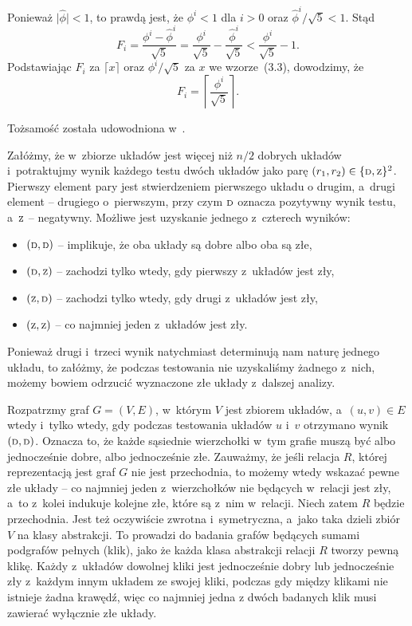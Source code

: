 \subproblem %
Ponieważ $\bigl|\widehat\phi\bigr|<1$, to prawdą jest, że $\phi^i<1$ dla $i>0$ oraz $\widehat\phi^i/\sqrt{5}<1$. Stąd
\[
	F_i = \frac{\phi^i-\widehat\phi^i}{\sqrt{5}} = \frac{\phi^i}{\sqrt{5}}-\frac{\widehat\phi^i}{\sqrt{5}} < \frac{\phi^i}{\sqrt{5}}-1.
\]
Podstawiając $F_i$ za $\lceil x\rceil$ oraz $\phi^i/\sqrt{5}$ za $x$ we wzorze~(3.3), dowodzimy, że
\[
	F_i = \left\lceil\frac{\phi^i}{\sqrt{5}}\right\rceil.
\]

\subproblem %
Tożsamość została udowodniona w~.


\subproblem %
Załóżmy, że w~zbiorze układów jest więcej niż $n/2$ dobrych układów i~potraktujmy wynik każdego testu dwóch układów jako parę $(r_1,r_2)\in\{{\scriptstyle\rm D},{\scriptstyle\rm Z}\}^2$. Pierwszy element pary jest stwierdzeniem pierwszego układu o drugim, a~drugi element -- drugiego o~pierwszym, przy czym ${\scriptstyle\rm D}$ oznacza pozytywny wynik testu, a~${\scriptstyle\rm Z}$ -- negatywny. Możliwe jest uzyskanie jednego z~czterech wyników:
\begin{itemize}
	\item $({\scriptstyle\rm D},{\scriptstyle\rm D})$ -- implikuje, że oba układy są dobre albo oba są złe,
	\item $({\scriptstyle\rm D},{\scriptstyle\rm Z})$ -- zachodzi tylko wtedy, gdy pierwszy z~układów jest zły,
	\item $({\scriptstyle\rm Z},{\scriptstyle\rm D})$ -- zachodzi tylko wtedy, gdy drugi z~układów jest zły,
	\item $({\scriptstyle\rm Z},{\scriptstyle\rm Z})$ -- co najmniej jeden z~układów jest zły.
\end{itemize}
Ponieważ drugi i~trzeci wynik natychmiast determinują nam naturę jednego układu, to załóżmy, że podczas testowania nie uzyskaliśmy żadnego z~nich, możemy bowiem odrzucić wyznaczone złe układy z~dalszej analizy.

Rozpatrzmy graf $G=(V,E)$, w~którym $V$ jest zbiorem układów, a~$(u,v)\in E$ wtedy i~tylko wtedy, gdy podczas testowania układów $u$ i~$v$ otrzymano wynik $({\scriptstyle\rm D},{\scriptstyle\rm D})$. Oznacza to, że każde sąsiednie wierzchołki w~tym grafie muszą być albo jednocześnie dobre, albo jednocześnie złe. Zauważmy, że jeśli relacja $R$, której reprezentacją jest graf $G$ nie jest przechodnia, to możemy wtedy wskazać pewne złe układy -- co najmniej jeden z~wierzchołków nie będących w~relacji jest zły, a~to z~kolei indukuje kolejne złe, które są z~nim w~relacji. Niech zatem $R$ będzie przechodnia. Jest też oczywiście zwrotna i~symetryczna, a~jako taka dzieli zbiór $V$ na klasy abstrakcji. To prowadzi do badania grafów będących sumami podgrafów pełnych (klik), jako że każda klasa abstrakcji relacji $R$ tworzy pewną klikę. Każdy z~układów dowolnej kliki jest jednocześnie dobry lub jednocześnie zły z~każdym innym układem ze swojej kliki, podczas gdy między klikami nie istnieje żadna krawędź, więc co najmniej jedna z dwóch badanych klik musi zawierać wyłącznie złe układy.

